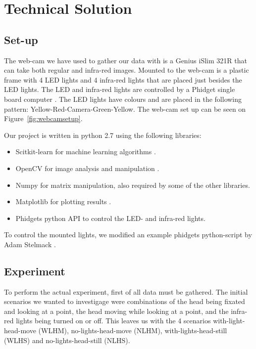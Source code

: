 \section{Technical Solution}
\label{sec:TechnicalSolution}
\subsection{Set-up}
\label{sub:Set-up}
The web-cam we have used to gather our data with is a Genius iSlim 321R that can take both regular and infra-red images.
Mounted to the web-cam is a plastic frame with 4 LED lights and 4 infra-red lights that are placed just besides the LED lights.
The LED and infra-red lights are controlled by a Phidget single board computer \cite{phidgets2012website}.
The LED lights have colours and are placed in the following pattern: Yellow-Red-Camera-Green-Yellow.
The web-cam set up can be seen on Figure~\ref{fig:webcamsetup}.

Our project is written in python 2.7 using the following libraries: 
\begin{itemize} %
\item{Scitkit-learn for machine learning algorithms \cite{scikitlearn2012website}.}
\item{OpenCV for image analysis and manipulation \cite{opencv2012website}.}
\item{Numpy for matrix manipulation, also required by some of the other libraries\cite{numpy2012website}.}
\item{Matplotlib for plotting results \cite{matplotlib2012website}.}
\item{Phidgets python API to control the LED- and infra-red lights.}
\end{itemize}

To control the mounted lights, we modified an example phidgets python-script by Adam Stelmack \cite{phidgetexample2012download}.

\subsection{Experiment}
\label{sub:Experiment}
To perform the actual experiment, first of all data must be gathered.
The initial scenarios we wanted to investigage were combinations of the head being fixated and looking at a point, the head moving while looking at a point, and the infra-red lights being turned on or off.
This leaves us with the 4 scenarios with-light-head-move (WLHM), no-lights-head-move (NLHM), with-lights-head-still (WLHS) and no-lights-head-still (NLHS).

